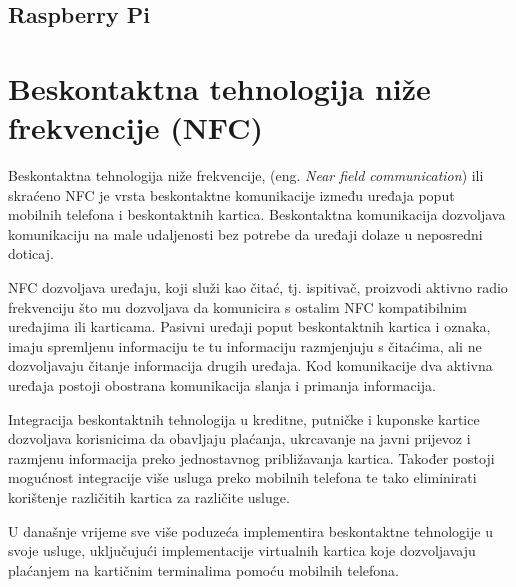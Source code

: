 \documentclass[times, utf8, zavrsni]{fer}
\begin{document}
\section{Raspberry Pi}
\chapter{Beskontaktna tehnologija niže frekvencije (\textbf{NFC})}
Beskontaktna tehnologija niže frekvencije, (eng. \textit{Near field communication}) ili skraćeno NFC je vrsta beskontaktne komunikacije između uređaja poput mobilnih telefona i beskontaktnih kartica. Beskontaktna komunikacija dozvoljava komunikaciju na male udaljenosti bez potrebe da uređaji dolaze u neposredni doticaj. \par
NFC dozvoljava uređaju, koji služi kao čitać, tj. ispitivač, proizvodi aktivno radio frekvenciju što mu dozvoljava da komunicira s ostalim NFC kompatibilnim uređajima ili karticama. Pasivni uređaji poput beskontaktnih kartica i oznaka, imaju spremljenu informaciju te tu informaciju razmjenjuju s čitaćima, ali ne dozvoljavaju čitanje informacija drugih uređaja. Kod komunikacije dva aktivna uređaja postoji obostrana komunikacija slanja i primanja informacija.\par 
Integracija beskontaktnih tehnologija u kreditne, putničke i kuponske kartice dozvoljava korisnicima da obavljaju plaćanja, ukrcavanje na javni prijevoz i razmjenu informacija preko jednostavnog  približavanja kartica. Također postoji mogućnost integracije više usluga preko mobilnih telefona te tako eliminirati korištenje različitih kartica za različite usluge.\par 
U današnje vrijeme sve više poduzeća implementira beskontaktne tehnologije u svoje usluge, uključujući implementacije virtualnih kartica koje dozvoljavaju plaćanjem na kartičnim terminalima pomoću mobilnih telefona.
\end{document}
